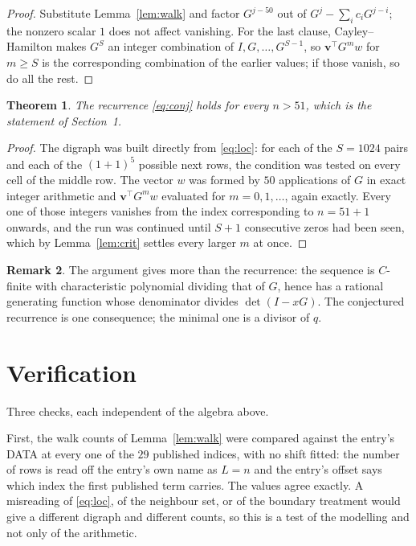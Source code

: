 \documentclass[11pt,a4paper]{article}
\theoremstyle{plain}
\newtheorem{theorem}{Theorem}
\theoremstyle{definition}
\newtheorem{remark}[theorem]{Remark}
\begin{document}
\begin{proof}
Substitute Lemma~\ref{lem:walk} and factor $G^{j-50}$ out of
$G^{j}-\sum_ic_iG^{j-i}$; the nonzero scalar $1$ does not affect
vanishing. For the last clause, Cayley--Hamilton makes $G^{S}$ an integer combination of
$I,G,\dots,G^{S-1}$, so $\mathbf{v}^{\!\top}G^{m}w$ for $m\ge S$ is the corresponding
combination of the earlier values; if those vanish, so do all the rest.
\end{proof}

\begin{theorem}
The recurrence \eqref{eq:conj} holds for every $n>51$, which is the statement of
Section~1.
\end{theorem}

\begin{proof}
The digraph was built directly from \eqref{eq:loc}: for each of the $S=1024$ pairs and each
of the $(1+1)^{5}$ possible next rows, the condition was tested on every cell of
the middle row. The vector $w$ was formed by $50$ applications of $G$ in exact integer
arithmetic and $\mathbf{v}^{\!\top}G^{m}w$ evaluated for $m=0,1,\dots$, again exactly.
Every one of those integers vanishes from the index corresponding to $n=51+1$ onwards,
and the run was continued until $S+1$ consecutive zeros had been seen, which by
Lemma~\ref{lem:crit} settles every larger $m$ at once.
\end{proof}

\begin{remark}
The argument gives more than the recurrence: the sequence is $C$-finite with characteristic
polynomial dividing that of $G$, hence has a rational generating function whose denominator
divides $\det(I-xG)$. The conjectured recurrence is one consequence; the minimal one is a
divisor of $q$.
\end{remark}

\section{Verification}

Three checks, each independent of the algebra above.

First, the walk counts of Lemma~\ref{lem:walk} were compared against the entry's DATA at
every one of the $29$ published indices, with no shift fitted: the number of rows is
read off the entry's own name as $L=n$ and the entry's offset says which index the first
published term carries. The values agree exactly. A misreading of \eqref{eq:loc}, of the
neighbour set, or of the boundary treatment would give a different digraph and different
counts, so this is a test of the modelling and not only of the arithmetic.
\end{document}
